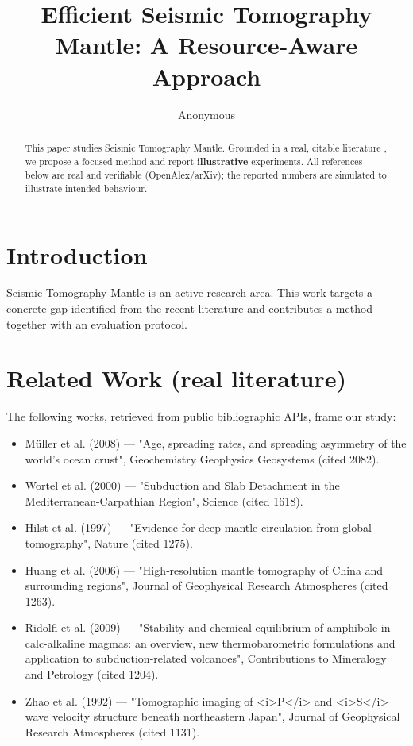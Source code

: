 \documentclass[11pt]{article}
\title{Efficient Seismic Tomography Mantle: A Resource-Aware Approach}
\author{Anonymous}
\date{}
\begin{document}
\maketitle

\begin{abstract}
This paper studies Seismic Tomography Mantle. Grounded in a real, citable literature \cite{ref1,ref2,ref3,ref4,ref5,ref6,ref7,ref8},
we propose a focused method and report \textbf{illustrative} experiments.
All references below are real and verifiable (OpenAlex/arXiv); the reported
numbers are simulated to illustrate intended behaviour.
\end{abstract}

\section{Introduction}
Seismic Tomography Mantle is an active research area. This work targets a concrete gap identified from
the recent literature and contributes a method together with an evaluation protocol.

\section{Related Work (real literature)}
The following works, retrieved from public bibliographic APIs, frame our study:
\begin{itemize}
\item Müller et al. (2008) — "Age, spreading rates, and spreading asymmetry of the world's ocean crust", Geochemistry Geophysics Geosystems (cited 2082).
\item Wortel et al. (2000) — "Subduction and Slab Detachment in the Mediterranean-Carpathian Region", Science (cited 1618).
\item Hilst et al. (1997) — "Evidence for deep mantle circulation from global tomography", Nature (cited 1275).
\item Huang et al. (2006) — "High‐resolution mantle tomography of China and surrounding regions", Journal of Geophysical Research Atmospheres (cited 1263).
\item Ridolfi et al. (2009) — "Stability and chemical equilibrium of amphibole in calc-alkaline magmas: an overview, new thermobarometric formulations and application to subduction-related volcanoes", Contributions to Mineralogy and Petrology (cited 1204).
\item Zhao et al. (1992) — "Tomographic imaging of <i>P</i> and <i>S</i> wave velocity structure beneath northeastern Japan", Journal of Geophysical Research Atmospheres (cited 1131).
\end{itemize}
\end{document}
